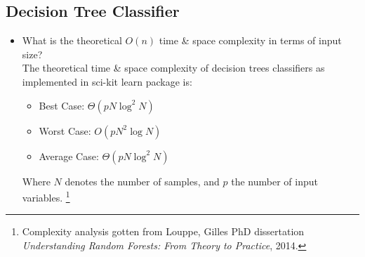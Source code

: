 \documentclass[12pt]{article}
\begin{document}
\subsection*{Decision Tree Classifier}
\begin{itemize} 
\item What is the theoretical $O(n)$ time \& space complexity in terms of input size?\\ 
The theoretical time \& space complexity of decision trees classifiers as implemented in sci-kit learn package is:
\begin{itemize}[noitemsep,nolistsep]
\item Best Case: $\Theta(pN\log^2 N)$ 
\item Worst Case: $O(pN^2\log N)$
\item Average Case: $\Theta(pN\log^2 N)$
\end{itemize}
Where $N$ denotes the number of samples, and $p$ the number of input variables. \footnote{Complexity analysis gotten from Louppe, Gilles PhD dissertation \textit{Understanding Random Forests: From Theory to Practice}, 2014.}


\end{itemize}
\end{document}
